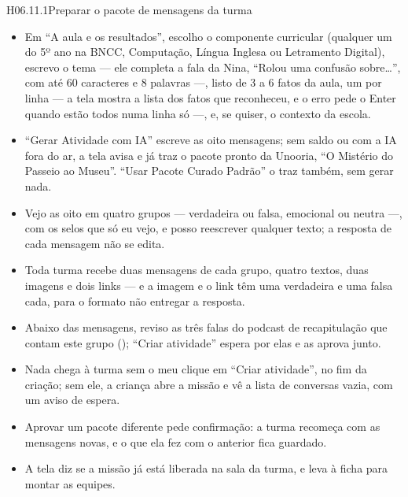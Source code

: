 \begin{historia}{H06.11.1}{Preparar o pacote de mensagens da turma}{\parcial}
\aceite
\begin{itemize}
  \item Em \enquote{A aula e os resultados}, escolho o componente curricular
    (qualquer um do 5º ano na BNCC, Computação, Língua Inglesa ou Letramento
    Digital), escrevo o tema --- ele completa a fala da Nina, \enquote{Rolou uma confusão
    sobre\ldots}, com até 60 caracteres e 8 palavras ---, listo de 3 a 6 fatos
    da aula, um por linha --- a tela mostra a lista dos fatos que reconheceu, e
    o erro pede o Enter quando estão todos numa linha só ---, e, se quiser, o
    contexto da escola.
  \item \enquote{Gerar Atividade com IA} escreve as oito mensagens; sem saldo
    ou com a IA fora do ar, a tela avisa e já traz o pacote pronto da Unooria,
    \enquote{O Mistério do Passeio ao Museu}. \enquote{Usar Pacote Curado
    Padrão} o traz também, sem gerar nada.
  \item Vejo as oito em quatro grupos --- verdadeira ou falsa, emocional ou
    neutra ---, com os selos que só eu vejo, e posso reescrever qualquer texto;
    a resposta de cada mensagem não se edita.
  \item Toda turma recebe duas mensagens de cada grupo, quatro textos, duas
    imagens e dois links --- e a imagem e o link têm uma verdadeira e uma falsa
    cada, para o formato não entregar a resposta.
  \item Abaixo das mensagens, reviso as três falas do podcast de
    recapitulação que contam este grupo (); \enquote{Criar
    atividade} espera por elas e as aprova junto.
  \item Nada chega à turma sem o meu clique em \enquote{Criar atividade}, no
    fim da criação; sem ele, a criança abre a missão e vê a lista de conversas
    vazia, com um aviso de espera.
  \item Aprovar um pacote diferente pede confirmação: a turma recomeça com as
    mensagens novas, e o que ela fez com o anterior fica guardado.
  \item A tela diz se a missão já está liberada na sala da turma, e leva à
    ficha para montar as equipes.
\end{itemize}
\end{historia}

